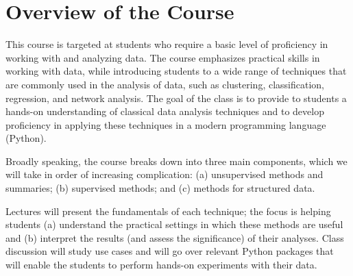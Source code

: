 \documentclass[11pt]{article}
\begin{document}
\section*{Overview of the Course}

This course is targeted at students who require a basic level of
proficiency in working with and analyzing data.  The course emphasizes
practical skills in working with data, while introducing students to a
wide range of techniques that are commonly used in the analysis of data,
such as clustering, classification, regression, and network analysis.
The goal of the class is to provide to students a hands-on understanding
of classical data analysis techniques and to develop proficiency in
applying these techniques in a modern programming language (Python). 

Broadly speaking, the course breaks down into three main components,
which we will take in order of increasing complication:  (a)
unsupervised methods and summaries; (b) supervised methods; and (c) methods for
structured data.

Lectures will present the fundamentals of each technique; the focus is 
helping
students (a) understand the practical settings in which these methods are
useful and (b) interpret the results (and assess the significance) of their analyses.
Class discussion will study use cases and will go over relevant
Python packages that will enable the students to perform hands-on
experiments with their data. 
\end{document}

